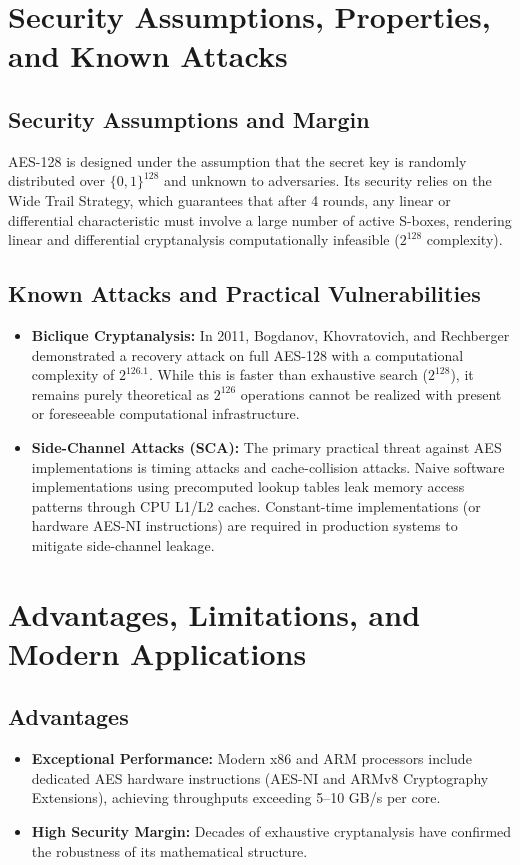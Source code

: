 \section{Security Assumptions, Properties, and Known Attacks}
\subsection{Security Assumptions and Margin}
AES-128 is designed under the assumption that the secret key is randomly distributed over $\{0, 1\}^{128}$ and unknown to adversaries. Its security relies on the Wide Trail Strategy, which guarantees that after 4 rounds, any linear or differential characteristic must involve a large number of active S-boxes, rendering linear and differential cryptanalysis computationally infeasible ($2^{128}$ complexity).

\subsection{Known Attacks and Practical Vulnerabilities}
\begin{itemize}
    \item \textbf{Biclique Cryptanalysis:} In 2011, Bogdanov, Khovratovich, and Rechberger \cite{biclique_aes} demonstrated a recovery attack on full AES-128 with a computational complexity of $2^{126.1}$. While this is faster than exhaustive search ($2^{128}$), it remains purely theoretical as $2^{126}$ operations cannot be realized with present or foreseeable computational infrastructure.
    \item \textbf{Side-Channel Attacks (SCA):} The primary practical threat against AES implementations is timing attacks and cache-collision attacks. Naive software implementations using precomputed lookup tables leak memory access patterns through CPU L1/L2 caches. Constant-time implementations (or hardware AES-NI instructions) are required in production systems to mitigate side-channel leakage.
\end{itemize}

\section{Advantages, Limitations, and Modern Applications}
\subsection{Advantages}
\begin{itemize}
    \item \textbf{Exceptional Performance:} Modern x86 and ARM processors include dedicated AES hardware instructions (AES-NI and ARMv8 Cryptography Extensions), achieving throughputs exceeding 5--10 GB/s per core.
    \item \textbf{High Security Margin:} Decades of exhaustive cryptanalysis have confirmed the robustness of its mathematical structure.
\end{itemize}

